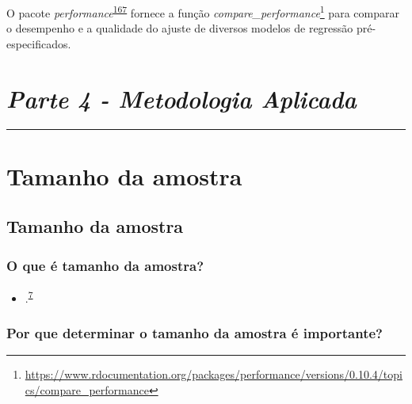 \documentclass[
  a4paper,
]{book}
\providecommand{\tightlist}{%
  \setlength{\itemsep}{0pt}\setlength{\parskip}{0pt}}
\renewcommand{\href}[2]{#2\footnote{\url{#1}}}
\newenvironment{infobox}[1]
  {
  \begin{itemize}
  \renewcommand{\labelitemi}{
    \raisebox{-.7\height}[0pt][0pt]{
      {\setkeys{Gin}{width=3em,keepaspectratio}
        \texttt{[image: \#1]}}
    }
  }
  \setlength{\fboxsep}{1em}
  \begin{blackbox}
  \item
  }
  {
  \end{blackbox}
  \end{itemize}
  }
\begin{document}
\begin{infobox}{images/Rlogo}
O pacote \emph{performance}\textsuperscript{\protect\hyperlink{ref-performance}{167}} fornece a função \href{https://www.rdocumentation.org/packages/performance/versions/0.10.4/topics/compare_performance}{\emph{compare\_performance}} para comparar o desempenho e a qualidade do ajuste de diversos modelos de regressão pré-especificados.

\end{infobox}


\hypertarget{parte-4---metodologia-aplicada}{%
\chapter*{\texorpdfstring{\emph{Parte 4 - Metodologia Aplicada}}{Parte 4 - Metodologia Aplicada}}\label{parte-4---metodologia-aplicada}}

\markboth{}{}
\par\noindent\rule{\textwidth}{0.05in}

\hypertarget{tamanho-amostral}{%
\chapter{\texorpdfstring{\textbf{Tamanho da amostra}}{Tamanho da amostra}}\label{tamanho-amostral}}

\hypertarget{tamanho-da-amostra}{%
\section{Tamanho da amostra}\label{tamanho-da-amostra}}

\hypertarget{o-que-uxe9-tamanho-da-amostra}{%
\subsection{O que é tamanho da amostra?}\label{o-que-uxe9-tamanho-da-amostra}}

\begin{itemize}
\tightlist
\item
  .\textsuperscript{\protect\hyperlink{ref-Banerjee2010}{7}}
\end{itemize}

\hypertarget{por-que-determinar-o-tamanho-da-amostra-uxe9-importante}{%
\subsection{Por que determinar o tamanho da amostra é importante?}\label{por-que-determinar-o-tamanho-da-amostra-uxe9-importante}}
\end{document}
